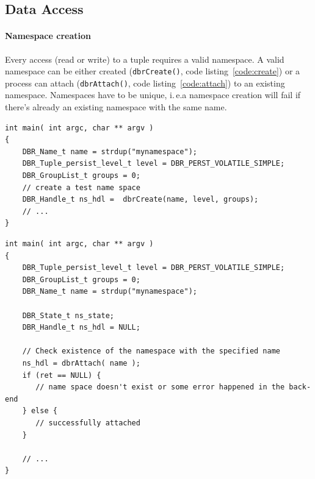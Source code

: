 \subsection{Data Access}
\label{sec:interface:access}
\paragraph{Namespace creation} Every access (read or write) to a tuple
requires a valid namespace.  A valid namespace can be either created
(\texttt{dbrCreate()}, code listing~\ref{code:create}) or a process can attach (\texttt{dbrAttach()}, code listing~\ref{code:attach}) to an
existing namespace.  Namespaces have to be unique, i.\,e.\@ a
namespace creation will fail if there's already an existing namespace
with the same name.

\begin{lstlisting}[style=mystyle,basicstyle=\scriptsize\ttfamily,caption=Creation of a namespace, label=code:create]
int main( int argc, char ** argv )
{
	DBR_Name_t name = strdup("mynamespace");
	DBR_Tuple_persist_level_t level = DBR_PERST_VOLATILE_SIMPLE;
	DBR_GroupList_t groups = 0;
	// create a test name space
	DBR_Handle_t ns_hdl =  dbrCreate(name, level, groups);
	// ...
}
\end{lstlisting}

\begin{lstlisting}[style=mystyle,basicstyle=\scriptsize\ttfamily,caption=Attach to a namespace, label=code:attach]
int main( int argc, char ** argv ) 
{
	DBR_Tuple_persist_level_t level = DBR_PERST_VOLATILE_SIMPLE;
	DBR_GroupList_t groups = 0;
	DBR_Name_t name = strdup("mynamespace");
	
	DBR_State_t ns_state;
	DBR_Handle_t ns_hdl = NULL;
	
	// Check existence of the namespace with the specified name
    ns_hdl = dbrAttach( name );
    if (ret == NULL) {
       // name space doesn't exist or some error happened in the back-end
    } else {
       // successfully attached
    }
		
	// ...
}
\end{lstlisting}

